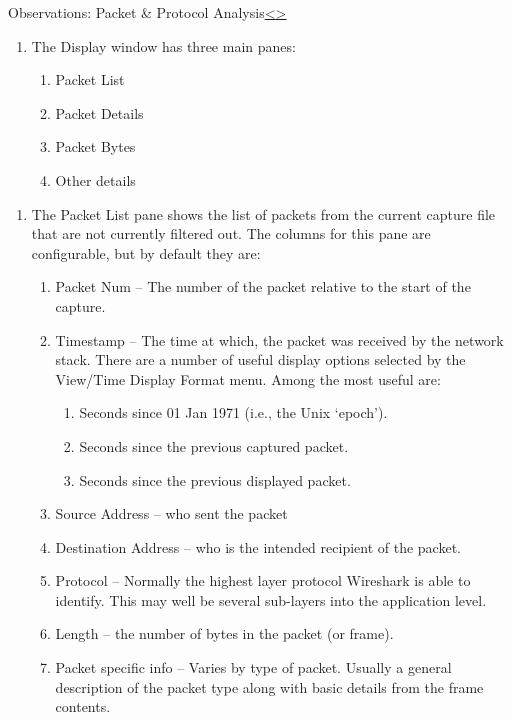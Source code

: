 \documentclass[12pt]{extarticle}
\newenvironment{instructionblock}{\Large\bgroup}{\egroup}
\newcommand{\ben}{\begin{enumerate}}
\newcommand{\een}{\end{enumerate}}
\begin{document}
\pagebreak
\begin{slide}{Observations: Packet \& Protocol Analysis}{\hyperref[slide 13]{\textless}\hyperref[slide 15]{\textgreater}}
\begin{instructionblock}
\begin{enumerate}
\item The Display window has three main panes:
\ben
	\item Packet List 
	\item Packet Details 
	\item Packet Bytes
	\item Other details 
\een
\end{enumerate}
\end{instructionblock}
\end{slide}
\begin{enumerate}
\item The Packet List pane shows the list of packets from the current capture file that are not currently filtered out.  The columns for this pane are configurable, but by default they are:\\
\ben
\item Packet Num -- The number of the packet relative to the start of the capture.
\item Timestamp -- The time at which, the packet was received by the network stack.  There are a number of useful display options selected by the View/Time Display Format menu.  Among the most useful are:
\ben
\item Seconds since 01 Jan 1971 (i.e., the Unix `epoch').
\item Seconds since the previous captured packet.
\item Seconds since the previous displayed packet.
\een
\item Source Address -- who sent the packet
\item Destination Address -- who is the intended recipient of the packet.
\item Protocol -- Normally the highest layer protocol Wireshark is able to identify.  This may well be several sub-layers into the application level.
\item Length -- the number of bytes in the packet (or frame).
\item Packet specific info -- Varies by type of packet.  Usually a general description of the packet type along with basic details from the frame contents.
\een
\end{enumerate}


\end{document}
